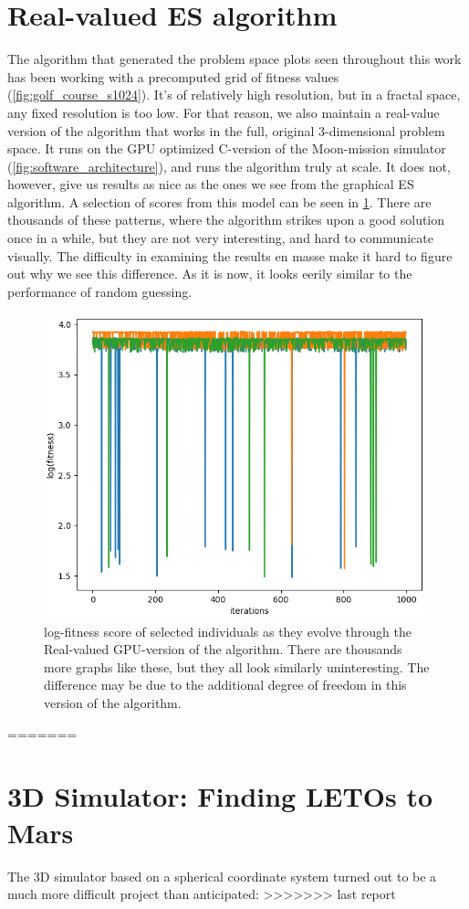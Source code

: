 \section{Real-valued ES algorithm}
The algorithm that generated the problem space plots seen throughout this work has been working with a precomputed grid of fitness values (\cref{fig:golf_course_s1024}). It's of relatively high resolution, but in a fractal space, any fixed resolution is too low. For that reason, we also maintain a real-value version of the algorithm that works in the full, original 3-dimensional problem space. It runs on the GPU optimized C-version of the Moon-mission simulator (\cref{fig:software_architecture}), and runs the algorithm truly at scale. It does not, however, give us results as nice as the ones we see from the graphical ES algorithm. A selection of scores from this model can be seen in \cref{fig:GPUresults}. There are thousands of these patterns, where the algorithm strikes upon a good solution once in a while, but they are not very interesting, and hard to communicate visually. The difficulty in examining the results en masse make it hard to figure out why we see this difference. As it is now, it looks eerily similar to the performance of random guessing.

\begin{figure}[ht]
    \centering
    \includegraphics[width=0.6\linewidth]{fig/GPUresults.png}
    \caption{log-fitness score of selected individuals as they evolve through the Real-valued GPU-version of the algorithm. There are thousands more graphs like these, but they all look similarly uninteresting. The difference may be due to the additional degree of freedom in this version of the algorithm.}
    \label{fig:GPUresults}
\end{figure} 
=======
\clearpage

\section{3D Simulator: Finding LETOs to Mars}
The 3D simulator based on a spherical coordinate system turned out to be a much more difficult project than anticipated:
>>>>>>> last report

